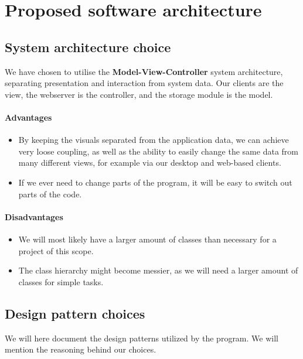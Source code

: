 \section{Proposed software architecture}
\label{sec:Proposed software architecture}






\subsection{System architecture choice}
We have chosen to utilise the \textbf{Model-View-Controller} system architecture, separating presentation and interaction from system data. Our clients are the view, the webserver is the controller, and the storage module is the model.

\paragraph{Advantages}
\begin{itemize}
	\item By keeping the visuals separated from the application data, we can achieve very loose coupling, as well as the ability to easily change the same data from many different views, for example via our desktop and web-based clients. \\
	\item If we ever need to change parts of the program, it will be easy to switch out parts of the code.
\end{itemize}


\paragraph{Disadvantages}
\begin{itemize}
	\item We will most likely have a larger amount of classes than necessary for a project of this scope. \\
	\item The class hierarchy might become messier, as we will need a larger amount of classes for simple tasks.
\end{itemize}

\subsection{Design pattern choices}
We will here document the design patterns utilized by the program. We will mention the reasoning behind our choices.

